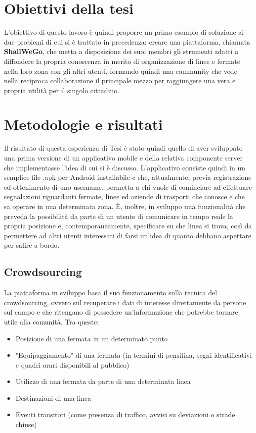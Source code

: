 \section{Obiettivi della tesi}
    L'obiettivo di questo lavoro è quindi proporre un primo esempio di soluzione ai due problemi di cui si è trattato in precedenza: creare una piattaforma, chiamata \textbf{ShallWeGo}, che metta a disposizione dei suoi membri gli strumenti adatti a diffondere la propria conoscenza in merito di organizzazione di linee e fermate nella loro zona con gli altri utenti, formando quindi una community che vede nella reciproca collaborazione il principale mezzo per raggiungere una vera e propria utilità per il singolo cittadino.

    
    
\section{Metodologie e risultati}
    Il risultato di questa esperienza di Tesi è stato quindi quello di aver sviluppato una prima versione di un applicativo mobile e della relativa componente server che implementasse l'idea di cui si è discusso. L'applicativo consiste quindi in un semplice file .apk per Android installabile e che, attualmente, previa registrazione ed ottenimento di uno username, permetta a chi vuole di cominciare ad effettuare segnalazioni riguardanti fermate, linee ed aziende di trasporti che conosce e che sa operare in una determinata zona.
    È, inoltre, in sviluppo una funzionalità che preveda la possibilità da parte di un utente di comunicare in tempo reale la propria posizione e, contemporaneamente, specificare su che linea si trova, così da permettere ad altri utenti interessati di farsi un'idea di quanto debbano aspettare per salire a bordo.
    \subsection{Crowdsourcing}
        La piattaforma in sviluppo basa il suo funzionamento sulla tecnica del crowdsourcing, ovvero sul recuperare i dati di interesse direttamente da persone sul campo e che ritengano di possedere un'informazione che potrebbe tornare utile alla comunità. Tra queste:
        \begin{itemize}
            \item Posizione di una fermata in un determinato punto
            \item "Equipaggiamento" di una fermata (in termini di pensilina, segni identificativi e quadri orari disponibili al pubblico)
            \item Utilizzo di una fermata da parte di una determinata linea
            \item Destinazioni di una linea
            \item Eventi transitori (come presenza di traffico, avvisi su deviazioni o strade chiuse)
        \end{itemize}

